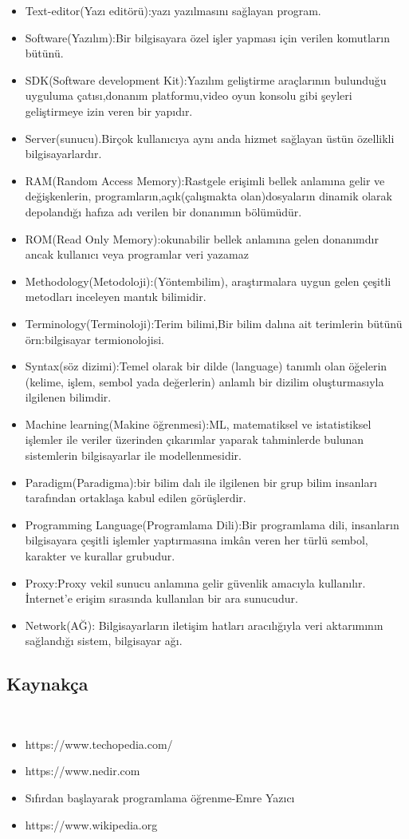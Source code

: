 \documentclass[10pt,a4paper,twoside]{article}
\begin{document}
\begin{itemize}
  \item Text-editor(Yazı editörü):yazı yazılmasını sağlayan program.
  \item Software(Yazılım):Bir bilgisayara özel işler  yapması için verilen komutların bütünü.
  \item SDK(Software development Kit):Yazılım geliştirme araçlarının bulunduğu uyguluma çatısı,donanım platformu,video oyun konsolu gibi şeyleri geliştirmeye izin veren bir yapıdır.
  \item Server(sunucu).Birçok kullanıcıya aynı anda hizmet sağlayan üstün özellikli  bilgisayarlardır.
  \item RAM(Random Access Memory):Rastgele erişimli bellek anlamına gelir ve  değişkenlerin, programların,açık(çalışmakta olan)dosyaların dinamik olarak depolandığı hafıza adı verilen bir donanımın bölümüdür.
  \item ROM(Read Only Memory):okunabilir bellek anlamına gelen donanımdır ancak kullanıcı veya programlar veri yazamaz
  \item Methodology(Metodoloji):(Yöntembilim), araştırmalara uygun gelen çeşitli metodları inceleyen mantık bilimidir.
  \item Terminology(Terminoloji):Terim bilimi,Bir bilim dalına ait terimlerin bütünü örn:bilgisayar termionolojisi.
  \item Syntax(söz dizimi):Temel olarak bir dilde (language) tanımlı olan öğelerin (kelime, işlem, sembol yada değerlerin) anlamlı bir dizilim oluşturmasıyla ilgilenen bilimdir.
  \item Machine learning(Makine öğrenmesi):ML, matematiksel ve istatistiksel işlemler ile veriler üzerinden çıkarımlar yaparak tahminlerde bulunan sistemlerin bilgisayarlar ile modellenmesidir.
  \item Paradigm(Paradigma):bir bilim dalı ile ilgilenen bir grup bilim insanları  tarafından ortaklaşa kabul edilen görüşlerdir.
  \item Programming Language(Programlama Dili):Bir programlama dili, insanların bilgisayara çeşitli işlemler yaptırmasına imkân veren her türlü sembol, karakter ve kurallar grubudur.
  \item Proxy:Proxy vekil sunucu anlamına gelir güvenlik amacıyla kullanılır. İnternet'e erişim sırasında kullanılan bir ara sunucudur.
  \item Network(AĞ): Bilgisayarların iletişim hatları aracılığıyla veri aktarımının sağlandığı sistem, bilgisayar ağı.
\end{itemize}

\newpage
  \begin{centering}
   \section{Kaynakça} \
\end{centering} 



\begin{itemize}
\item https://www.techopedia.com/
\item https://www.nedir.com
\item Sıfırdan başlayarak programlama öğrenme-Emre Yazıcı
\item https://www.wikipedia.org
\end{itemize}
\end{document}
